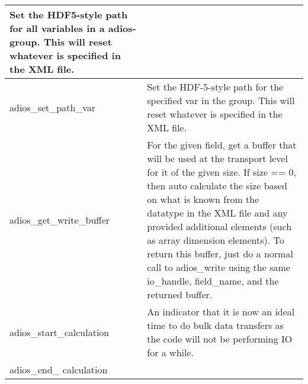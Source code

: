 {\begin{longtable}{llll}
{\begin{minipage}[t]{2.960in}
\linebreak
{\color{color01} Set the HDF5-style path for all variables in a adios-group. This 
will reset whatever is specified in the XML file.}\end{minipage}}\\
\hline
\multicolumn{1}{|p{1.540in}|}{\begin{minipage}[t]{1.540in}\raggedright
adios\_set\_path\_var\end{minipage}} & \multicolumn{3}{p{2.960in}|}{\begin{minipage}[t]{2.960in}\raggedright
\linebreak
{\color{color01} Set the HDF-5-style path for the specified var in the group. This 
will reset whatever is specified in the XML file.}\end{minipage}}\\
\hline
\multicolumn{1}{|p{1.540in}|}{\begin{minipage}[t]{1.540in}\raggedright
{\color{color01} adios\_get\_write\_buffer}\end{minipage}} & \multicolumn{3}{p{2.960in}|}{\begin{minipage}[t]{2.960in}\raggedright
{\color{color01} For the given field, get a buffer that will be used at the transport 
level for it of the given size. If size == 0, then auto calculate the size based 
on what is known from the datatype in the XML file and any provided additional 
elements (such as array dimension elements). To return this buffer, just do a normal 
call to adios\_write using the same io\_handle, field\_name, and the returned buffer.}\end{minipage}}\\
\hline
\multicolumn{1}{|p{1.540in}|}{\begin{minipage}[t]{1.540in}\raggedright
adios\_start\_calculation\end{minipage}} & \multicolumn{3}{p{2.960in}|}{\begin{minipage}[t]{2.960in}\raggedright
{\color{color01} An indicator that it is now an ideal time to do bulk data transfers 
as the code will not be performing IO for a while.}\end{minipage}}\\
\hline
\multicolumn{1}{|p{1.540in}|}{\begin{minipage}[t]{1.540in}\raggedright
adios\_end\_ calculation\end{minipage}} & \multicolumn{3}{p{2.960in}|}{\begin{minipage}[t]{2.960in}\raggedright

\end{minipage}}
\end{longtable}}
